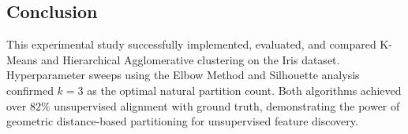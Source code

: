 \documentclass[12pt]{article}
\begin{document}
\subsection{Conclusion}
This experimental study successfully implemented, evaluated, and compared K-Means and Hierarchical Agglomerative clustering on the Iris dataset. Hyperparameter sweeps using the Elbow Method and Silhouette analysis confirmed $k=3$ as the optimal natural partition count. Both algorithms achieved over $82\%$ unsupervised alignment with ground truth, demonstrating the power of geometric distance-based partitioning for unsupervised feature discovery.
\end{document}
